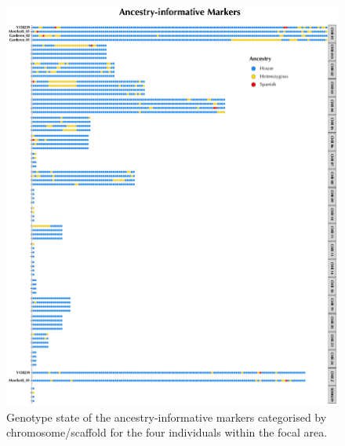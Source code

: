\begin{figure}
    \centering
    \includegraphics[width=\linewidth]{Figures/Y150239Genomics--AncestryHeatmap_AIMs.pdf}
    \caption{Genotype state of the ancestry-informative markers categorised by chromosome/scaffold for the four individuals within the focal area.}
    \label{fig:SIfigure-06}
\end{figure}